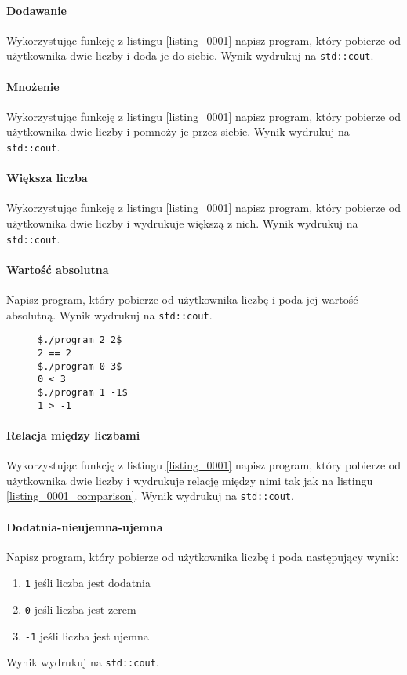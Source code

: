 \documentclass[11pt,a4paper,titlepage,onecolumn]{article}
\begin{document}
\paragraph{Dodawanie} Wykorzystując funkcję z listingu \ref{listing_0001} napisz
program, który pobierze od użytkownika dwie liczby i doda je do siebie. Wynik
wydrukuj na \texttt{std::cout}.

\paragraph{Mnożenie} Wykorzystując funkcję z listingu \ref{listing_0001} napisz
program, który pobierze od użytkownika dwie liczby i pomnoży je przez siebie.
Wynik wydrukuj na \texttt{std::cout}.

\paragraph{Większa liczba} Wykorzystując funkcję z listingu \ref{listing_0001} napisz
program, który pobierze od użytkownika dwie liczby i wydrukuje większą z nich.
Wynik wydrukuj na \texttt{std::cout}.

\paragraph{Wartość absolutna} Napisz program, który pobierze od użytkownika
liczbę i poda jej wartość absolutną. Wynik wydrukuj na \texttt{std::cout}.

\begin{figure}
\begin{lstlisting}[caption={relacja między liczbami},
    captionpos=b,
    label=listing_0001_comparison]
$./program 2 2$
2 == 2
$./program 0 3$
0 < 3
$./program 1 -1$
1 > -1
\end{lstlisting}
\end{figure}

\paragraph{Relacja między liczbami}\label{ex_0001_relationship_between_numbers}
Wykorzystując funkcję z listingu \ref{listing_0001} napisz program, który
pobierze od użytkownika dwie liczby i wydrukuje relację między nimi tak jak na
listingu \ref{listing_0001_comparison}.
Wynik wydrukuj na \texttt{std::cout}.

\paragraph{Dodatnia-nieujemna-ujemna} Napisz program, który pobierze od
użytkownika liczbę i poda następujący wynik:
\begin{enumerate}
    \item \texttt{1} jeśli liczba jest dodatnia
    \item \texttt{0} jeśli liczba jest zerem
    \item \texttt{-1} jeśli liczba jest ujemna
\end{enumerate}
Wynik wydrukuj na \texttt{std::cout}.
\end{document}
